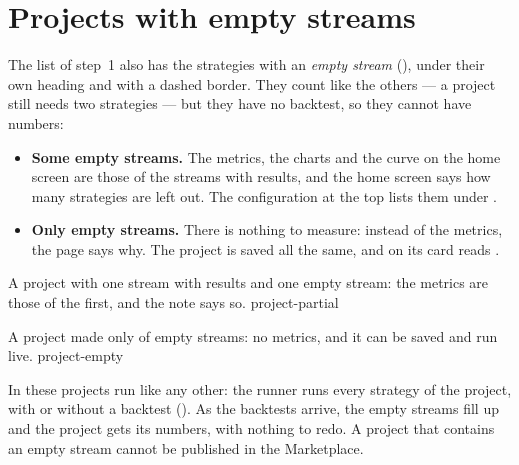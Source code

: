 \section{Projects with empty streams}\label{sez:project-empty}

The list of step~1 also has the strategies with an \emph{empty stream}
(), under their own heading and with a dashed border. They
count like the others --- a project still needs two strategies --- but they
have no backtest, so they cannot have numbers:

\begin{itemize}
  \item \textbf{Some empty streams.} The metrics, the charts and the curve on
        the home screen are those of the streams with results, and the home
        screen says how many strategies are left out. The configuration at
        the top lists them under .
  \item \textbf{Only empty streams.} There is nothing to measure: instead of
        the metrics, the page says why. The project is saved all the same, and
        on  its card reads .
\end{itemize}

  {A project with one stream with results and one empty stream: the metrics
   are those of the first, and the note says so.}
  {project-partial}

  {A project made only of empty streams: no metrics, and it can be saved and
   run live.}
  {project-empty}

\noindent
In  these projects run like any other: the runner runs every
strategy of the project, with or without a backtest (). As
the backtests arrive, the empty streams fill up and the project gets its
numbers, with nothing to redo. A project that contains an empty stream cannot
be published in the Marketplace.
